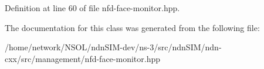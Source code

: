 Definition at line 60 of file nfd-\/face-\/monitor.\+hpp.



The documentation for this class was generated from the following file\+:\begin{DoxyCompactItemize}
\item 
/home/network/\+N\+S\+O\+L/ndn\+S\+I\+M-\/dev/ns-\/3/src/ndn\+S\+I\+M/ndn-\/cxx/src/management/nfd-\/face-\/monitor.\+hpp\end{DoxyCompactItemize}
